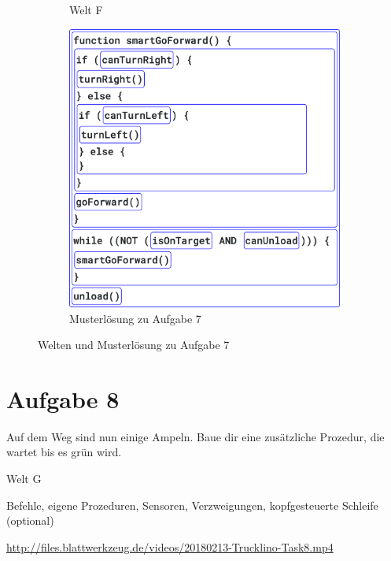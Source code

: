 \begin{figure}[H]
\begin{subfigure}[b]{0.40\textwidth}
    \caption{Welt F}
  \end{subfigure}
  \vspace{0.5cm}
  \begin{subfigure}[b]{0.40\textwidth}
    \includegraphics[width=\textwidth]{gfx/exercises-program-7.png}
    \caption{Musterlösung zu Aufgabe 7}
  \end{subfigure}
  \caption{Welten und Musterlösung zu Aufgabe 7}
\end{figure}

\pagebreak

\section*{Aufgabe 8}
\label{sec:exercises:8}

Auf dem Weg sind nun einige Ampeln. Baue dir eine zusätzliche Prozedur, die wartet bis es grün wird.

\begin{description}[noitemsep]
  \item[Welt wählen:] Welt G
  \item[Du brauchst:] Befehle, eigene Prozeduren, Sensoren, Verzweigungen, kopfgesteuerte Schleife (optional)
  \item[Video:] \url{http://files.blattwerkzeug.de/videos/20180213-Trucklino-Task8.mp4}
\end{description}


